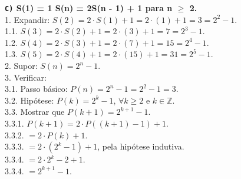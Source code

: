 \documentclass[12pt, a4paper]{article}
\newcommand{\Z}{\mathbb{Z}}
\newcommand\tab[1][1cm]{\hspace*{#1}}
\begin{document}
\begin{flushleft}
\vskip10mm

\textbf{\textbf{\texttt{C)}} S(1) = 1 \tab S(n) = 2S(n - 1) + 1 para n $\geq$ 2.\\}
\textsf{1. Expandir: $S(2) = 2 \cdot S(1) + 1 = 2 \cdot (1) + 1 = 3 = 2^2-1$. 
\\ \tab 1.1. \tab[0.37cm]  $S(3) = 2 \cdot S(2) + 1 = 2 \cdot (3) + 1 = 7 = 2^3-1$.
\\ \tab 1.2. \tab[0.37cm]  $S(4) = 2 \cdot S(3) + 1 = 2 \cdot (7) + 1 = 15 = 2^4-1$.
\\ \tab 1.3. \tab[0.37cm]  $S(5) = 2 \cdot S(4) + 1 = 2 \cdot (15) + 1 = 31 = 2^5-1$.
\\2. Supor: $S(n) = 2^n-1$.
\\3. Verificar: 
\\ \tab 3.1. Passo básico: $P(n) = 2^n-1 = 2^2-1 = 3$.
\\ \tab 3.2. Hipótese: $P(k) = 2^k-1$, $ \forall k \geq 2$ e $k \in \Z$.
\\ \tab 3.3. Mostrar que $P(k+1) = \boxed{ 2^{k+1} - 1 }$.
\\ \tab \tab 3.3.1. $P(k+1) = 2 \cdot P((k+1)-1) + 1$.
\\ \tab \tab 3.3.2. \tab \tab[0.6cm] $= 2 \cdot P(k) + 1$.
\\ \tab \tab 3.3.3. \tab \tab[0.6cm] $= 2 \cdot (2^k-1) + 1$, pela hipótese indutiva.
\\ \tab \tab 3.3.4. \tab \tab[0.6cm] $= 2 \cdot 2^k -2 + 1$.
\\ \tab \tab 3.3.4. \tab \tab[0.6cm] $= \boxed{2^{k+1} - 1}$.}


 
 
\end{flushleft}   
\end{document}

